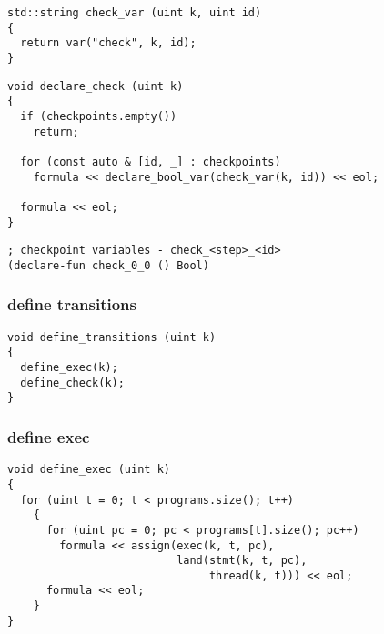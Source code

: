 \begin{lstlisting}[style=c++]
std::string check_var (uint k, uint id)
{
  return var("check", k, id);
}
\end{lstlisting}

\begin{lstlisting}[style=c++]
void declare_check (uint k)
{
  if (checkpoints.empty())
    return;

  for (const auto & [id, _] : checkpoints)
    formula << declare_bool_var(check_var(k, id)) << eol;

  formula << eol;
}
\end{lstlisting}

\begin{lstlisting}[language=SMTLib]
; checkpoint variables - check_<step>_<id>
(declare-fun check_0_0 () Bool)
\end{lstlisting}

\subsubsection{define transitions}

\begin{lstlisting}[style=c++]
void define_transitions (uint k)
{
  define_exec(k);
  define_check(k);
}
\end{lstlisting}

\subsubsection{define exec}

\begin{lstlisting}[style=c++]
void define_exec (uint k)
{
  for (uint t = 0; t < programs.size(); t++)
    {
      for (uint pc = 0; pc < programs[t].size(); pc++)
        formula << assign(exec(k, t, pc),
                          land(stmt(k, t, pc),
                               thread(k, t))) << eol;
      formula << eol;
    }
}
\end{lstlisting}

